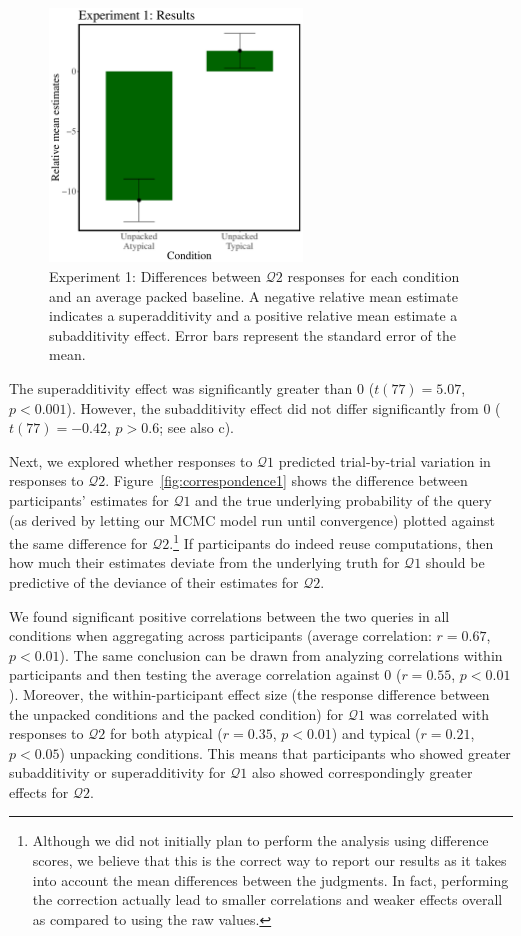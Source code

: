 \begin{figure}
\centering
\includegraphics[width=0.6\textwidth]{figures/amo1results.pdf}
\caption{Experiment 1: Differences between $\mathcal{Q}2$ responses for each condition and an average packed baseline. A negative relative mean estimate indicates a superadditivity and a positive relative mean estimate a subadditivity effect. Error bars represent the standard error of the mean.}
\label{fig:meandiffs1}
\end{figure}

The superadditivity effect was significantly greater than 0 ($t(77)=5.07$, $p<0.001$). However, the subadditivity effect did not differ significantly from 0 ($t(77)=-0.42$, $p>0.6$; see also c\citet{dasgupta17}).

Next, we explored whether responses to $\mathcal{Q}1$ predicted trial-by-trial variation in responses to $\mathcal{Q}2$. Figure~\ref{fig:correspondence1} shows the difference between participants' estimates for $\mathcal{Q}1$ and the true underlying probability of the query (as derived by letting our MCMC model run until convergence) plotted against the same difference for $\mathcal{Q}2$.\footnote{Although we did not initially plan to perform the analysis using difference scores, we believe that this is the correct way to report our results as it takes into account the mean differences between the judgments. In fact, performing the correction actually lead to smaller correlations and weaker effects overall as compared to using the raw values.} If participants do indeed reuse computations, then how much their estimates deviate from the underlying truth for $\mathcal{Q}1$ should be predictive of the deviance of their estimates for $\mathcal{Q}2$.

We found significant positive correlations between the two queries in all conditions when aggregating across participants (average correlation: $r=0.67$, $p<0.01$). The same conclusion can be drawn from analyzing correlations within participants and then testing the average correlation against 0 ($r=0.55$, $p<0.01$). Moreover, the within-participant effect size (the response difference between the unpacked conditions and the packed condition) for $\mathcal{Q}1$ was correlated with responses to $\mathcal{Q}2$ for both atypical ($r=0.35$, $p<0.01$) and typical ($r=0.21$, $p<0.05$) unpacking conditions. This means that participants who showed greater subadditivity or superadditivity for $\mathcal{Q}1$ also showed correspondingly greater effects for $\mathcal{Q}2$.

